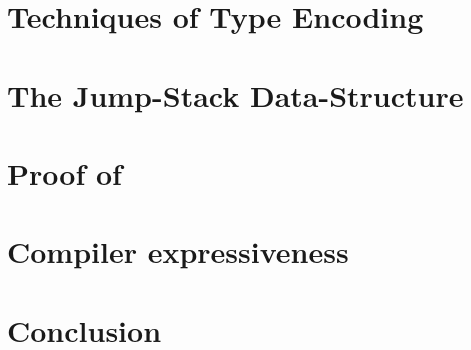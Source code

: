 \documentclass[a4paper,USenglish]{lipics}
\begin{document}
\section{Techniques of Type Encoding}
\label{Section:toolkit}


\section{The Jump-Stack Data-Structure}
\label{Section:jump}


\section{Proof of }
\label{Section:proof}


\section{\Java Compiler expressiveness}
\label{Section:compiler}


\section{Conclusion}
\label{Section:zz}


\small

\end{document}
